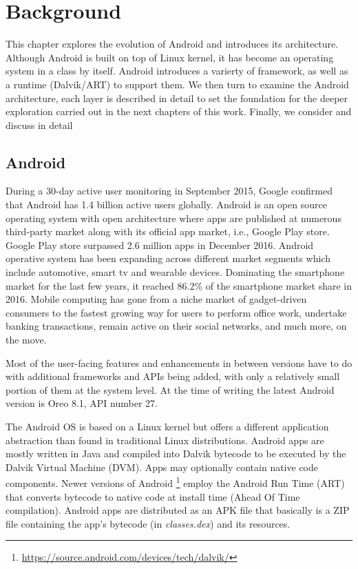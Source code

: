 \chapter{Background}

This chapter explores the evolution of Android and introduces its architecture. Although Android is built on top of Linux kernel, it has become an operating system in a class by itself. Android introduces a varierty of framework, as well as a runtime (Dalvik/ART) to support them. We then turn to examine the Android architecture, each layer is described in detail to set the foundation for the deeper exploration carried out in the next chapters of this work. Finally, we consider and discuss in detail 

\section{Android}


During a 30-day active user monitoring in September 2015, Google confirmed that Android has 1.4 billion active users globally. Android is an open source operating system with open architecture where apps are published at numerous third-party market along with its official app market, i.e., Google Play store. Google Play store surpassed 2.6 million apps in December 2016. Android operative system has been expanding across different market segments which include automotive, smart tv and wearable devices. Dominating the smartphone market for the last few years, it reached 86.2\% of the smartphone market share in 2016. Mobile computing has gone from a niche market of gadget-driven consumers to the fastest growing way for users to perform office work, undertake banking transactions, remain active on their social networks, and much more, on the move. 

Most of the user-facing features and enhancements in between versions have to do with additional frameworks and APIs being added, with only a relatively small portion of them at the system level. At the time of writing the latest Android version is Oreo 8.1, API number 27. 

The Android OS is based on a Linux kernel but offers a different application abstraction than found in traditional Linux distributions. Android apps are mostly written in Java and compiled into Dalvik bytecode to be executed by the Dalvik Virtual Machine (DVM). Apps may optionally contain native code components. Newer versions of Android \footnote{\url{https://source.android.com/devices/tech/dalvik/}} employ the Android Run Time (ART) that converts bytecode to native code at install time (Ahead Of Time compilation). Android apps are distributed as an APK file that basically is a ZIP file containing the app's bytecode (in \textit{classes.dex}) and its resources. 

